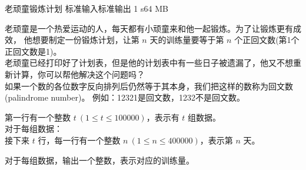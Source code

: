 \gdef\thisproblemauthor{wchhlbt}
\begin{problem}{老顽童锻炼计划}
{标准输入}{标准输出}
{1 s}{64 MB}{}

老顽童是一个热爱运动的人，每天都有小顽童来和他一起锻炼。为了让锻炼更有成效，
他想要制定一份锻炼计划，让第 $n$ 天的训练量要等于第 $n$ 个正回文数(第1个正回文数是1)。\\
老顽童已经打印好了计划表，但是他的计划表中有一些日子被遗漏了，他又不想重新计算，你可以帮他解决这个问题吗？\\
如果一个数的各位数字反向排列后仍然等于其本身，我们把这样的数称为回文数(palindrome number)。
例如：12321是回文数，1232不是回文数。

\InputFile

第一行有一个整数 $t\ (1 \le t \le 100000)$，表示有 $t$ 组数据。\\
对于每组数据：\\
接下来 $t$ 行，每一行有一个整数 $n\ (1\le n\le 400000)$，表示第 $n$ 天。

\OutputFile

对于每组数据，输出一个整数，表示对应的训练量。\\

\Example

\begin{example}
%
\end{example}

\end{problem}
